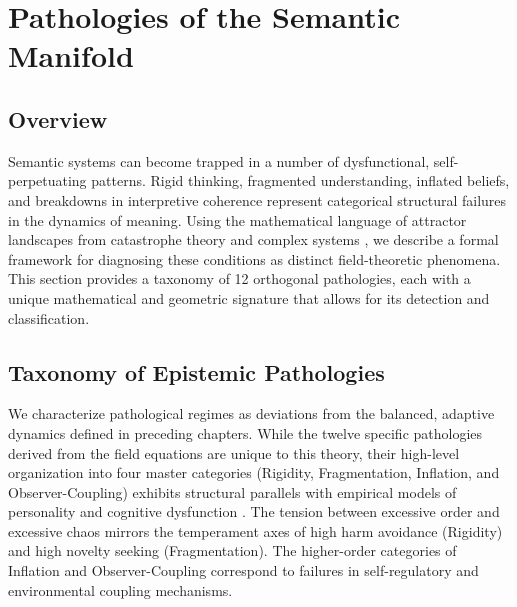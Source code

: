 \chapter{Pathologies of the Semantic Manifold}
\label{16:pathologies_of_the_semantic_manifold}


\section{Overview}
\label{16.1:overview}

Semantic systems can become trapped in a number of dysfunctional, self-perpetuating patterns. Rigid thinking, fragmented understanding, inflated beliefs, and breakdowns in interpretive coherence represent categorical structural failures in the dynamics of meaning. Using the mathematical language of attractor landscapes from catastrophe theory and complex systems \autocite{Thom1975, Zeeman1977, Milnor1985}, we describe a formal framework for diagnosing these conditions as distinct field-theoretic phenomena. This section provides a taxonomy of 12 orthogonal pathologies, each with a unique mathematical and geometric signature that allows for its detection and classification.


\section{Taxonomy of Epistemic Pathologies}
\label{16.2:taxonomy_of_epistemic_pathologies}

We characterize pathological regimes as deviations from the balanced, adaptive dynamics defined in preceding chapters. While the twelve specific pathologies derived from the field equations are unique to this theory, their high-level organization into four master categories (Rigidity, Fragmentation, Inflation, and Observer-Coupling) exhibits structural parallels with empirical models of personality and cognitive dysfunction \autocite{Cloninger1993}. The tension between excessive order and excessive chaos mirrors the temperament axes of high harm avoidance (Rigidity) and high novelty seeking (Fragmentation). The higher-order categories of Inflation and Observer-Coupling correspond to failures in self-regulatory and environmental coupling mechanisms. 


